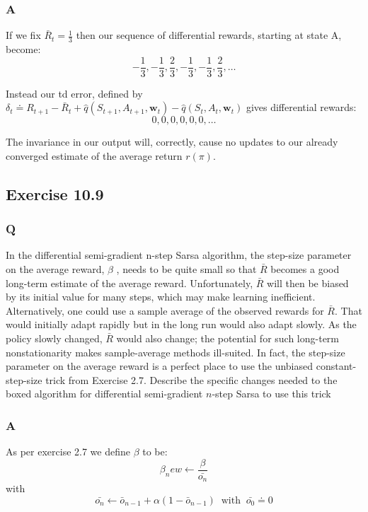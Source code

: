 \subsubsection{A}
If we fix $\bar{R}_t = \frac{1}{3}$ then our sequence of differential rewards, starting at state A, become:
\begin{equation}
-\frac{1}{3}, -\frac{1}{3}, \frac{2}{3}, -\frac{1}{3}, -\frac{1}{3}, \frac{2}{3}, \ldots
\end{equation} 

Instead our td error, defined by $\delta_t \doteq R_{t+1} - \bar{R}_t + \hat{q}(S_{t+1}, A_{t+1}, \textbf{w}_t) - \hat{q}(S_t, A_t, \textbf{w}_t)$ gives differential rewards:
\begin{equation}
0, 0, 0, 0, 0, 0, \ldots
\end{equation}

The invariance in our output will, correctly, cause no updates to our already converged estimate of the average return $r(\pi)$.

\subsection{Exercise 10.9}
\subsubsection{Q}
In the differential semi-gradient n-step Sarsa algorithm, the step-size parameter on the average reward, $\beta$ , needs to be quite small so that $\bar{R}$ becomes a good long-term estimate of the average reward. Unfortunately, $\bar{R}$ will then be biased by its initial value for many steps, which may make learning inefficient. Alternatively, one could use a sample average of the observed rewards for $\bar{R}$. That would initially adapt rapidly but in the long run would also adapt slowly. As the policy slowly changed, $\bar{R}$ would also change; the potential for such long-term nonstationarity makes sample-average methods ill-suited. In fact, the step-size parameter on the average reward is a perfect place to use the unbiased constant-step-size trick from Exercise 2.7. Describe the specific changes needed to the boxed algorithm for differential semi-gradient $n$-step Sarsa to use this trick
\subsubsection{A}
As per exercise 2.7 we define $\beta$ to be:
\begin{equation}
\beta_new \leftarrow \frac{\beta}{\bar{o_n}}
\end{equation}
with
\begin{equation}
\bar{o_n} \leftarrow \bar{o}_{n-1} + \alpha(1 - \bar{o}_{n-1}) \; \; \text{with} \; \; \bar{o_0} \doteq 0
\end{equation}


